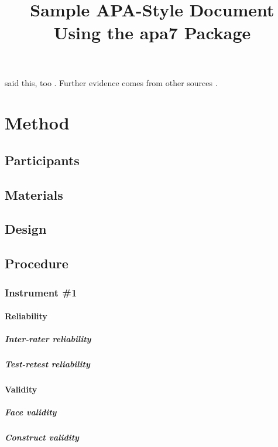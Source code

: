 \documentclass[man]{apa7}
\title{Sample APA-Style Document Using the \textsf{apa7} Package}
\begin{document}
\maketitle
\lipsum[2]

\Textcite{vonDavier2011} said this,
too \parencite{vonDavier2011,Lassen2006}.  Further evidence comes from
other sources \parencite{Shotton1989,Lassen2006}.  \lipsum[3]

\section{Method}
\subsection{Participants}
\lipsum[4]

\subsection{Materials}
\lipsum[5]

\subsection{Design}
\lipsum[6]

\subsection{Procedure}
\lipsum[7]

\subsubsection{Instrument \#1}
\lipsum[8]

\paragraph{Reliability}
\lipsum[9]

\subparagraph{Inter-rater reliability}
\lipsum[10]

\subparagraph{Test-retest reliability}
\lipsum[11]

\paragraph{Validity}
\lipsum[12]

\subparagraph{Face validity}
\lipsum[13]

\subparagraph{Construct validity}
\lipsum[14]
\end{document}
